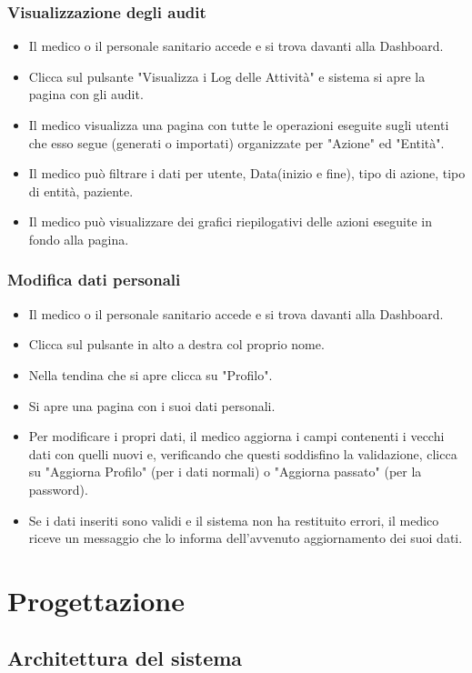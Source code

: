 \documentclass[12pt,a4paper,oneside]{report}
\begin{document}
\subsection{Visualizzazione degli audit}
\begin{itemize}
    \item Il medico o il personale sanitario accede e si trova davanti alla Dashboard.
    \item Clicca sul pulsante "Visualizza i Log delle Attività" e sistema si apre la pagina con gli audit.
    \item Il medico visualizza una pagina con tutte le operazioni eseguite sugli utenti che esso segue (generati o importati) organizzate per "Azione" ed "Entità".
    \item Il medico può filtrare i dati per utente, Data(inizio e fine), tipo di azione, tipo di entità, paziente.
    \item Il medico può visualizzare dei grafici riepilogativi delle azioni eseguite in fondo alla pagina.
\end{itemize}

\subsection{Modifica dati personali}
\begin{itemize}
    \item Il medico o il personale sanitario accede e si trova davanti alla Dashboard.
    \item Clicca sul pulsante in alto a destra col proprio nome.
    \item Nella tendina che si apre clicca su "Profilo".
    \item Si apre una pagina con i suoi dati personali.
    \item Per modificare i propri dati, il medico aggiorna i campi contenenti i vecchi dati con quelli nuovi e, verificando che questi soddisfino la validazione, clicca su "Aggiorna Profilo" (per i dati normali) o "Aggiorna passato" (per la password).
    \item Se i dati inseriti sono validi e il sistema non ha restituito errori, il medico riceve un messaggio che lo informa dell'avvenuto aggiornamento dei suoi dati.
\end{itemize}

\chapter{Progettazione}
\section{Architettura del sistema}
\end{document}

